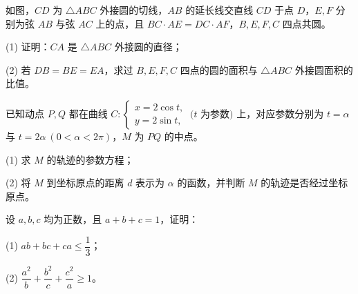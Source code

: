 \begin{question}
如图，$CD$ 为 $\triangle ABC$ 外接圆的切线，$AB$ 的延长线交直线 $CD$ 于点 $D$，$E,F$ 分别为弦 $AB$ 与弦 $AC$ 上的点，且 $BC\cdot AE=DC\cdot AF$，$B,E,F,C$ 四点共圆。
\nopagebreak[4]
\begin{center}\end{center}
\nopagebreak[4]
(1) 证明：$CA$ 是 $\triangle ABC$ 外接圆的直径；

(2) 若 $DB=BE=EA$，求过 $B,E,F,C$ 四点的圆的面积与 $\triangle ABC$ 外接圆面积的比值。

\end{question}
\begin{question}
已知动点 $P,Q$ 都在曲线 $C:\begin{cases}x=2\cos t,\\y=2\sin t,\end{cases}\ (t$ 为参数$)$ 上，对应参数分别为 $t=\alpha$ 与 $t=2\alpha\ (0<\alpha<2\pi)$，$M$ 为 $PQ$ 的中点。

(1) 求 $M$ 的轨迹的参数方程；

(2) 将 $M$ 到坐标原点的距离 $d$ 表示为 $\alpha$ 的函数，并判断 $M$ 的轨迹是否经过坐标原点。

\end{question}
\begin{question}
设 $a,b,c$ 均为正数，且 $a+b+c=1$，证明：

(1) $ab+bc+ca\leqslant\dfrac13$；

(2) $\dfrac{a^2}{b}+\dfrac{b^2}{c}+\dfrac{c^2}{a}\geqslant1$。

\end{question}